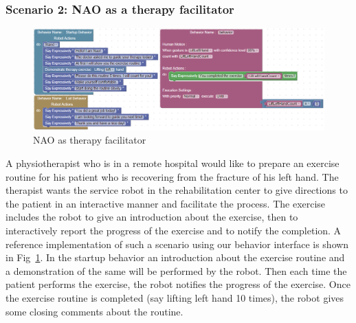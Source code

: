 \documentclass{llncs}
\begin{document}
\subsubsection{Scenario 2: NAO as a therapy facilitator}%
\begin{figure}
\includegraphics[width=\textwidth]{../thesis/assets/scenario2_horizontal.png}
\caption[NAO as therapy facilitator]{NAO as therapy facilitator}
\label{fig:scenario2_program}
\end{figure}
A physiotherapist who is in a remote hospital would like to prepare an exercise routine for his patient who is recovering from the fracture of his left hand. The therapist wants the service robot in the rehabilitation center to give directions to the patient in an interactive manner and facilitate the process. The exercise includes the robot to give an introduction about the exercise, then to interactively report the progress of the exercise and to notify the completion. A reference implementation of such a scenario using our behavior interface is shown in Fig~\ref{fig:scenario2_program}. In the startup behavior an introduction about the exercise routine and a demonstration of the same will be performed by the robot. Then each time the patient performs the exercise, the robot notifies the progress of the exercise. Once the exercise routine is completed (say lifting left hand 10 times), the robot gives some closing comments about the routine.
\end{document}
